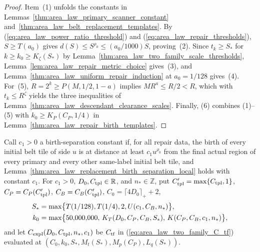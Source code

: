 \begin{proof}
    \leanok
    Item~(1) unfolds the constants in
    Lemmas~\ref{thm:area_law_primary_scanner_constant}
    and~\ref{thm:area_law_belt_replacement_templates}. By
    (\ref{eq:area_law_power_ratio_threshold}) and
    (\ref{eq:area_law_repair_thresholds}), $S\ge T(a_0)$ gives
    $d(S)\le S^{\rho_0}\le(a_0/1000)S$, proving~(2). Since $t_k\ge S_*$ for
    $k\ge k_0\ge K_\zeta(S_*)$ by
    Lemma~\ref{thm:area_law_two_family_scale_thresholds},
    Lemma~\ref{lem:area_law_repair_metric_choice} gives~(3), and
    Lemma~\ref{thm:area_law_uniform_repair_induction} at $a_0=1/128$ gives~(4).
    For~(5), $R=2^k\ge P(M,1/2,1-a)$ implies $MR^a\le R/2<R$, which with
    $t_k\le R^\zeta$ yields the three inequalities of
    Lemma~\ref{thm:area_law_descendant_clearance_scales}. Finally, (6)
    combines (1)--(5) with $k_0\ge K_P(C_P,1/4)$ in
    Lemma~\ref{thm:area_law_repair_birth_templates}.
\end{proof}

\begin{definition}
    \label{def:area_law_two_family_explicit_constant}
    \leanok
    Call $c_1>0$ a birth-separation constant if, for all repair data, the birth
    of every initial belt tile of side $u$ is at distance at least
    $c_1u^{\rho_0}$ from the final actual region of every primary and every
    other same-label initial belt tile, and
    Lemma~\ref{thm:area_law_replacement_birth_separation_local} holds with
    constant $c_1$. For $c_1>0$, $D_0,C_{\rm tpl}\in\mathbb R$, and
    $n_*\in\mathbb Z$, put $C_{\rm tpl}'=\max\{C_{\rm tpl},1\}$,
    $C_P=C_P(C_{\rm tpl}')$, $C_B=C_B(C_{\rm tpl}')$, $C_0=\lceil4D_0\rceil_++2$,
    \begin{align}
        S_* & =\max\bigl\{T(1/128),T(1/4),2,U(c_1,C_B,n_*)\bigr\}, \notag \\
        k_0 & =\max\bigl\{50{,}000{,}000,\,K_T(D_0,C_P,C_B,S_*),\,
        K(C_P,C_B,c_1,n_*)\bigr\},
        \label{eq:area_law_explicit_S_k0}
    \end{align}
    and let $C_{\rm expl}(D_0,C_{\rm tpl},n_*,c_1)$ be $C_{\rm tf}$ in
    (\ref{eq:area_law_two_family_C_tf}) evaluated at
    $(C_0,k_0,S_*,M_t(S_*),M_p(C_P),L_q(S_*))$.
\end{definition}

